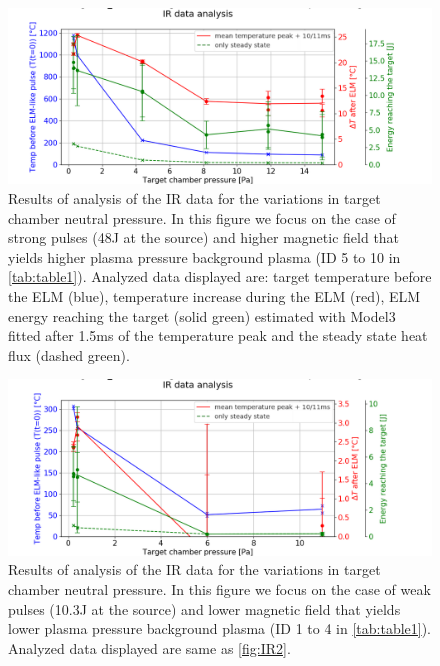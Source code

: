\begin{figure}
	\centering
	\includegraphics[width=0.9\linewidth,trim={35 0 75 22},clip]{Chapters/chapter3/figs/image515_2.png}
	\caption{Results of analysis of the IR data for the variations in target chamber neutral pressure. In this figure we focus on the case of strong pulses (48J at the source) and higher magnetic field that yields higher plasma pressure background plasma (ID 5 to 10 in \autoref{tab:table1}). Analyzed data displayed are: target temperature before the ELM (blue), temperature increase during the ELM (red), ELM energy reaching the target (solid green) estimated with Model3 fitted after 1.5ms of the temperature peak and the steady state heat flux (dashed green).}
	\label{fig:IR2}
\end{figure}
\begin{figure}
	\centering
	\includegraphics[width=0.9\linewidth,trim={35 0 80 30},clip]{Chapters/chapter3/figs/image516_2.png}
	\caption{Results of analysis of the IR data for the variations in target chamber neutral pressure. In this figure we focus on the case of weak pulses (10.3J at the source) and lower magnetic field that yields lower plasma pressure background plasma (ID 1 to 4 in \autoref{tab:table1}). Analyzed data displayed are same as \autoref{fig:IR2}.}
	\label{fig:IR3}
\end{figure}

